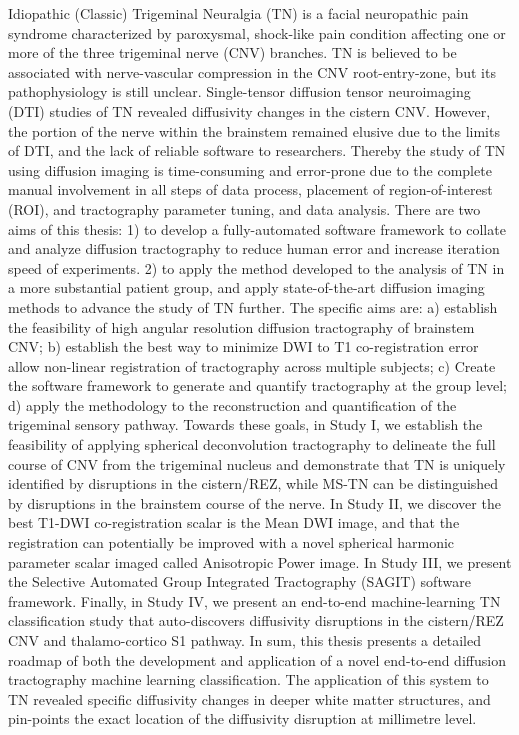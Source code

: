 Idiopathic (Classic) Trigeminal Neuralgia (TN) is a facial neuropathic pain syndrome characterized by paroxysmal, shock-like pain condition affecting one or more of the three trigeminal nerve (CNV) branches. TN is believed to be associated with nerve-vascular compression in the CNV root-entry-zone, but its pathophysiology is still unclear. Single-tensor diffusion tensor neuroimaging (DTI) studies of TN revealed diffusivity changes in the cistern CNV. However, the portion of the nerve within the brainstem remained elusive due to the limits of DTI, and the lack of reliable software to researchers. Thereby the study of TN using diffusion imaging is time-consuming and error-prone due to the complete manual involvement in all steps of data process, placement of region-of-interest (ROI), and tractography parameter tuning, and data analysis. 
There are two aims of this thesis: 1) to develop a fully-automated software framework to collate and analyze diffusion tractography to reduce human error and increase iteration speed of experiments. 2) to apply the method developed to the analysis of TN in a more substantial patient group, and apply state-of-the-art diffusion imaging methods to advance the study of TN further. 
The specific aims are: a) establish the feasibility of high angular resolution diffusion tractography of brainstem CNV; b) establish the best way to minimize DWI to T1 co-registration error allow non-linear registration of tractography across multiple subjects; c) Create the software framework to generate and quantify tractography at the group level; d) apply the methodology to the reconstruction and quantification of the trigeminal sensory pathway. 
Towards these goals, in Study I, we establish the feasibility of applying spherical deconvolution tractography to delineate the full course of CNV from the trigeminal nucleus and demonstrate that TN is uniquely identified by disruptions in the cistern/REZ, while MS-TN can be distinguished by disruptions in the brainstem course of the nerve. In Study II, we discover the best T1-DWI co-registration scalar is the Mean DWI image, and that the registration can potentially be improved with a novel spherical harmonic parameter scalar imaged called Anisotropic Power image. In Study III, we present the Selective Automated Group Integrated Tractography (SAGIT) software framework. Finally, in Study IV, we present an end-to-end machine-learning TN classification study that auto-discovers diffusivity disruptions in the cistern/REZ CNV and thalamo-cortico S1 pathway. 
In sum, this thesis presents a detailed roadmap of both the development and application of a novel end-to-end diffusion tractography machine learning classification. The application of this system to TN revealed specific diffusivity changes in deeper white matter structures, and pin-points the exact location of the diffusivity disruption at millimetre level. 